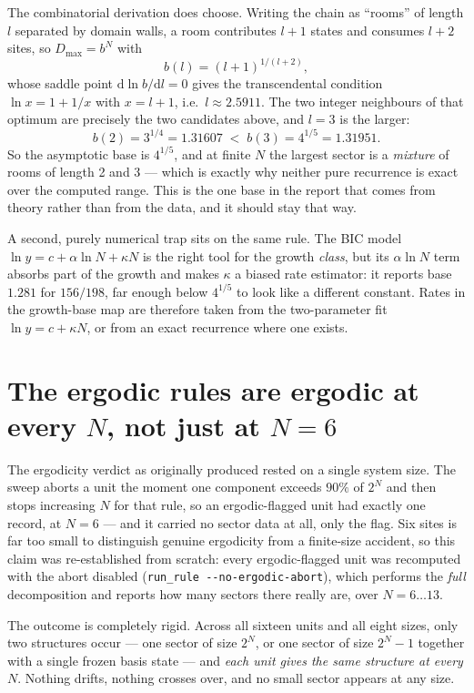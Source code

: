 \documentclass[11pt]{article}
\newcommand{\rt}[1]{\texttt{#1}}
\begin{document}
The combinatorial derivation does choose. Writing the chain as ``rooms'' of
length $l$ separated by domain walls, a room contributes $l+1$ states and
consumes $l+2$ sites, so $D_{\max}=b^N$ with
\begin{equation}
  b(l)=(l+1)^{1/(l+2)} ,
\end{equation}
whose saddle point $\mathrm{d}\ln b/\mathrm{d}l=0$ gives the transcendental
condition $\ln x = 1+1/x$ with $x=l+1$, i.e.\ $l\approx 2.5911$. The two
integer neighbours of that optimum are precisely the two candidates above, and
$l=3$ is the larger:
\[
  b(2)=3^{1/4}=1.31607 \;<\; b(3)=4^{1/5}=1.31951 .
\]
So the asymptotic base is $4^{1/5}$, and at finite $N$ the largest sector is a
\emph{mixture} of rooms of length 2 and 3 --- which is exactly why neither pure
recurrence is exact over the computed range. This is the one base in the report
that comes from theory rather than from the data, and it should stay that way.

A second, purely numerical trap sits on the same rule. The BIC model
$\ln y = c+\alpha\ln N+\kappa N$ is the right tool for the growth \emph{class},
but its $\alpha\ln N$ term absorbs part of the growth and makes $\kappa$ a
biased rate estimator: it reports base $1.281$ for $156/198$, far enough below
$4^{1/5}$ to look like a different constant. Rates in the growth-base map are
therefore taken from the two-parameter fit $\ln y=c+\kappa N$, or from an exact
recurrence where one exists.

\section{The ergodic rules are ergodic at every $N$, not just at $N=6$}
\label{sec:ergodic}
The ergodicity verdict as originally produced rested on a single system size.
The sweep aborts a unit the moment one component exceeds $90\%$ of $2^N$ and then
stops increasing $N$ for that rule, so an ergodic-flagged unit had exactly one
record, at $N=6$ --- and it carried no sector data at all, only the flag. Six
sites is far too small to distinguish genuine ergodicity from a finite-size
accident, so this claim was re-established from scratch: every ergodic-flagged
unit was recomputed with the abort disabled (\rt{run\_rule -{}-no-ergodic-abort}),
which performs the \emph{full} decomposition and reports how many sectors there
really are, over $N=6\ldots13$.

The outcome is completely rigid. Across all sixteen units and all eight sizes,
only two structures occur --- one sector of size $2^N$, or one sector of size
$2^N-1$ together with a single frozen basis state --- and \emph{each unit gives
the same structure at every $N$}. Nothing drifts, nothing crosses over, and no
small sector appears at any size.
\end{document}

